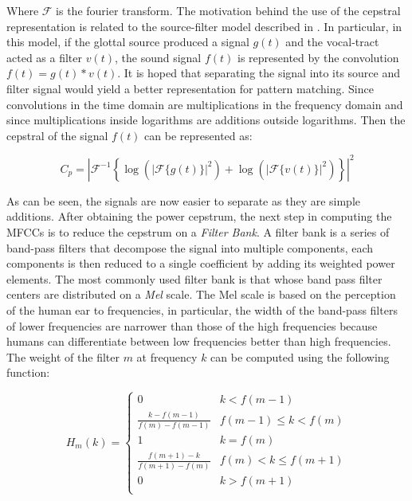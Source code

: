 \documentclass[twocolumn]{article}
\begin{document}
Where $\mathcal{F}$ is the fourier transform. The motivation behind the use of
the cepstral representation is related to the source-filter model described in
\autocite{Degottex2010}. In particular, in this model, if the glottal source
produced a signal $g(t)$ and the vocal-tract acted as a filter $v(t)$, the
sound signal $f(t)$ is represented by the convolution $f(t) = g(t)*v(t)$. It is
hoped that separating the signal into its source and filter signal would yield
a better representation for pattern matching. Since convolutions in the time
domain are multiplications in the frequency domain and since multiplications
inside logarithms are additions outside logarithms. Then the cepstral of the
signal $f(t)$ can be represented as:

\begin{equation}
C_{p} = \left|{\mathcal{F}}^{-1}\left\{
        \log\left(\left|{\mathcal{F}}\{g(t)\}\right|^{2}\right) +
        \log\left(\left|{\mathcal{F}}\{v(t)\}\right|^{2}\right)
        \right\}\right|^{2}
\end{equation}

As can be seen, the signals are now easier to separate as they are simple
additions. After obtaining the power cepstrum, the next step in computing the
MFCCs is to reduce the cepstrum on a \emph{Filter Bank}. A filter bank is a
series of band-pass filters that decompose the signal into multiple components,
each components is then reduced to a single coefficient by adding its weighted
power elements. The most commonly used filter bank is that whose band pass
filter centers are distributed on a \emph{Mel} scale. The Mel scale is based on
the perception of the human ear to frequencies, in particular, the width of the
band-pass filters of lower frequencies are narrower than those of the high
frequencies because humans can differentiate between low frequencies better
than high frequencies. The weight of the filter $m$ at frequency $k$ can be
computed using the following function:

\begin{equation}
H_{m}(k) =
\begin{cases}
0 & k < f(m - 1) \\
\frac{k - f(m - 1)}{f(m) - f(m - 1)} & f(m - 1) \leq k < f(m) \\ 
1 & k = f(m) \\
\frac{f(m + 1) - k}{f(m + 1) - f(m)} & f(m) < k \leq f(m + 1) \\ 
0 & k > f(m + 1) \\
\end{cases}
\end{equation}
\end{document}

